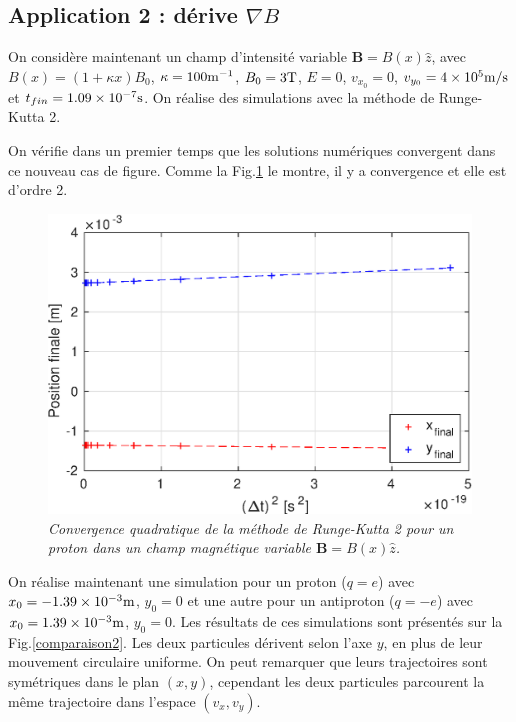 \documentclass[a4paper,12pt,oneside]{article}
\begin{document}
\newpage
\subsection{Application 2 : dérive $\nabla B$}

On considère maintenant un champ d'intensité variable $\textbf{B}=B(x) \hat{z}$, avec $B(x)=(1+ \kappa x) B_0$, $\kappa = 100 \rm m^{-1}$, $B_0=3 \rm T$, $E=0$, $v_{x_0} = 0$, $v_{y_0}=4 \times 10^5 \rm m/s$ et $t_{fin}=1.09 \times 10^{-7} \rm s$. On réalise des simulations avec la méthode de Runge-Kutta 2.

On vérifie dans un premier temps que les solutions numériques convergent dans ce nouveau cas de figure. Comme la Fig.\ref{etudeConv2} le montre, il y a convergence et elle est d'ordre 2.

\begin{figure}[H]
\centerline{\includegraphics[width=0.9\linewidth,angle=0]{application2/etudeConv2}}
\caption{ \label{etudeConv2}\em
 Convergence quadratique de la méthode de Runge-Kutta 2 pour un proton dans un champ magnétique variable $\textbf{B}=B(x) \hat{z}$.
}
\end{figure}

On réalise maintenant une simulation pour un proton ($q=e$) avec $x_0= -1.39 \times 10^{-3} \rm m$, $y_0=0$ et une autre pour un antiproton ($q=-e$) avec $x_0= 1.39 \times 10^{-3} \rm m$, $y_0=0$. Les résultats de ces simulations sont présentés sur la Fig.\ref{comparaison2}. Les deux particules dérivent selon l'axe $y$, en plus de leur mouvement circulaire uniforme. On peut remarquer que leurs trajectoires sont symétriques dans le plan $(x,y)$, cependant les deux particules parcourent la même trajectoire dans l'espace $(v_x,v_y)$.
\end{document}
